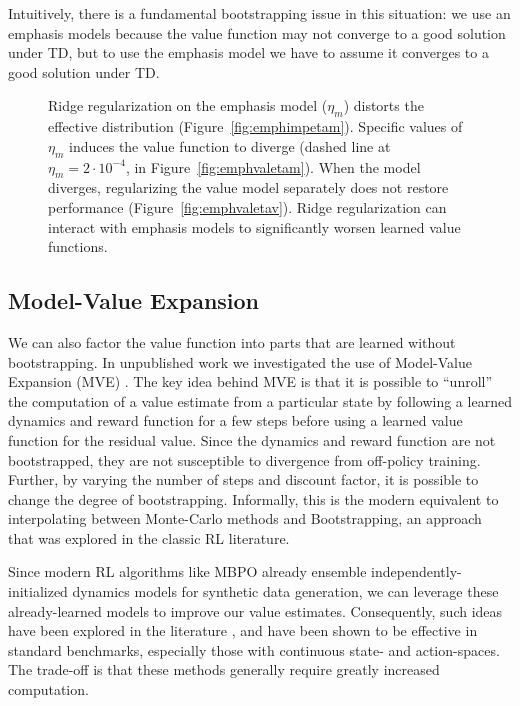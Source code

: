 \documentclass[11pt]{article}
\begin{document}
Intuitively, there is a fundamental bootstrapping issue in this situation: we use an emphasis models because the value function may not converge to a good solution under TD, but to use the emphasis model we have to assume it converges to a good solution under TD.

\begin{figure}
  
  \label{fig:emphasisplotseta}
  \caption{Ridge regularization on the emphasis model ($\eta_m$) distorts the effective distribution (Figure~\ref{fig:emphimpetam}). Specific values of $\eta_m$ induces the value function to diverge (dashed line at $\eta_m=2\cdot 10^{-4}$, in Figure~\ref{fig:emphvaletam}). When the model diverges, regularizing the value model separately does not restore performance (Figure~\ref{fig:emphvaletav}). Ridge regularization can interact with emphasis models to significantly worsen learned value functions. }
\end{figure}


\subsection{Model-Value Expansion}

We can also factor the value function into parts that are learned without bootstrapping. In unpublished work \cite{manek2021mve} we investigated the use of Model-Value Expansion (MVE) \cite{Feinberg2018ModelBasedVE}.
The key idea behind MVE is that it is possible to ``unroll'' the computation of a value estimate from a particular state by following a learned dynamics and reward function for a few steps before using a learned value function for the residual value. Since the dynamics and reward function are not bootstrapped, they are not susceptible to divergence from off-policy training. Further, by varying the number of steps and discount factor, it is possible to change the degree of bootstrapping. Informally, this is the modern equivalent to interpolating between Monte-Carlo methods and Bootstrapping, an approach that was explored in the classic RL literature.

Since modern RL algorithms like MBPO \cite{janner2019mbpo} already ensemble independently-initialized dynamics models for synthetic data generation, we can leverage these already-learned models to improve our value estimates. Consequently, such ideas have been explored in the literature \cite{lee2021sunrise,Feinberg2018ModelBasedVE,buckman2018steve}, and have been shown to be effective in standard benchmarks, especially those with continuous state- and action-spaces. The trade-off is that these methods generally require greatly increased computation.
\end{document}
